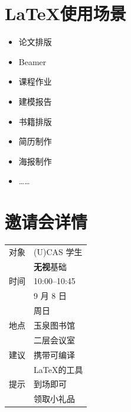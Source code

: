 \documentclass[a0paper,fleqn]{betterposter}
\begin{document}
{\section{\LaTeX 使用场景}
\begin{multicols}{2}
\begin{itemize}
\item %
论文排版
\item Beamer
\item 课程作业
\item 建模报告
\item 书籍排版
\item 简历制作
\item 海报制作
\item ……
\end{itemize}
\end{multicols}

\section{邀请会详情}
\begin{tabular}{l@{\quad}p{}}
对象 & (U)CAS 学生\\ & \textbf{无视}基础 \\[1ex]
时间 & 10:00--10:45\\ & 9 月 8 日 \\ & 周日 \\[1ex]
地点 & 玉泉图书馆\\ & 二层会议室 \\[1ex]
建议 & 携带可编译\\ & \LaTeX 的工具 \\[1ex]
提示 & 到场即可\\ & 领取小礼品 \\
\end{tabular}
}
\end{document}

